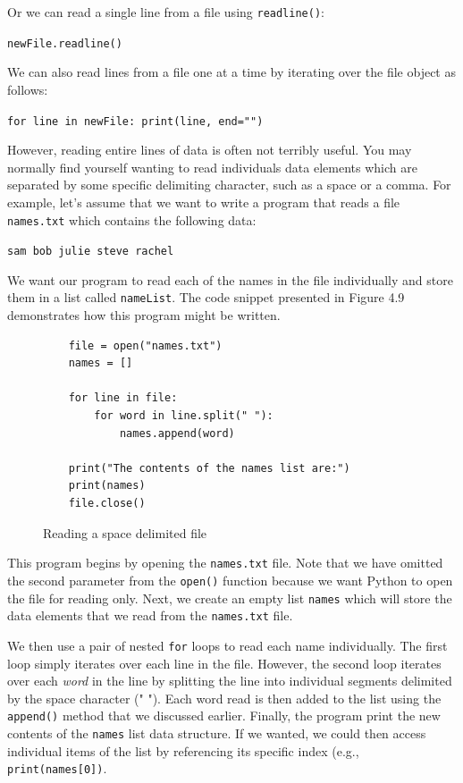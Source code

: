 \documentclass{book}
\begin{document}
Or we can read a single line from a file using \texttt{readline()}:

\texttt{newFile.readline()}

We can also read lines from a file one at a time by iterating over the file object as follows:

\texttt{for line in newFile:   print(line, end="")}

However, reading entire lines of data is often not terribly useful. You may normally find yourself wanting to read individuals data elements which are separated by some specific delimiting character, such as a space or a comma. For example, let's assume that we want to write a program that reads a file \texttt{names.txt} which contains the following data:

\texttt{sam bob julie steve rachel}

We want our program to read each of the names in the file individually and store them in a list called \texttt{nameList}. The code snippet presented in Figure 4.9 demonstrates how this program might be written.

\begin{figure}[h]
\caption{Reading a space delimited file}
\begin{lstlisting}
	file = open("names.txt")
	names = []

	for line in file:
		for word in line.split(" "):
			names.append(word)

	print("The contents of the names list are:")
	print(names)
	file.close()
	\end{lstlisting}
\end{figure}

This program begins by opening the \texttt{names.txt} file. Note that we have omitted the second parameter from the \texttt{open()} function because we want Python to open the file for reading only. Next, we create an empty list \texttt{names} which will store the data elements that we read from the \texttt{names.txt} file.

We then use a pair of nested \texttt{for} loops to read each name individually. The first loop simply iterates over each line in the file. However, the second loop iterates over each \textit{word} in the line by splitting the line into individual segments delimited by the space character (" "). Each word read is then added to the list using the \texttt{append()} method that we discussed earlier. Finally, the program print the new contents of the \texttt{names} list data structure. If we wanted, we could then access individual items of the list by referencing its specific index (e.g., \texttt{print(names[0])}.
\end{document}
